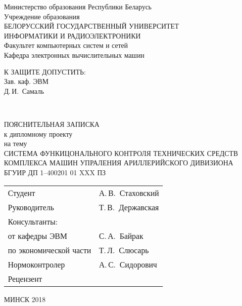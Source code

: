 \begin{titlepage}
  \begin{center}
    Министерство образования Республики Беларусь \\[1em]
    Учреждение образования \\
    БЕЛОРУССКИЙ ГОСУДАРСТВЕННЫЙ УНИВЕРСИТЕТ \\
    ИНФОРМАТИКИ И РАДИОЭЛЕКТРОНИКИ \\[1em]

    Факультет компьютерных систем и сетей \\ [1em]
    Кафедра электронных вычислительных машин \\[2em]

    \begin{flushright}
      \begin{minipage}{0.4\textwidth}
        К ЗАЩИТЕ ДОПУСТИТЬ: \\
        Зав. каф. ЭВМ \\
        \underline{\hspace*{2.8cm}} Д.\,И.~Самаль
      \end{minipage}\\[2.2em]
    \end{flushright}

    {ПОЯСНИТЕЛЬНАЯ ЗАПИСКА}\\
    {к дипломному проекту}\\
    {на тему}\\
    {СИСТЕМА ФУНКИЦОНАЛЬНОГО КОНТРОЛЯ ТЕХНИЧЕСКИХ СРЕДСТВ КОМПЛЕКСА МАШИН УПРАЛЕНИЯ АРИЛЛЕРИЙСКОГО ДИВИЗИОНА}\\[2em]


    {БГУИР ДП 1--400201 01 XXX ПЗ}\\[2em]

    \begin{tabular}{ p{}p{} }
      Студент & А.\,В.~Стаховский\\[1em]
      Руководитель & Т.\,В.~Державская \\[1em]
      Консультанты: &\\[1em]
      \hspace*{3ex}от кафедры ЭВМ & С.\,А.~Байрак \\[1em]
      \hspace*{3ex}по экономической части & Т.\,Л.~Слюсарь \\[1em]
      Нормоконтролер & А.\,С.~Сидорович\\[1em]
      Рецензент &
    \end{tabular}

    \vfill
    {\normalsize МИНСК 2018}
  \end{center}
\end{titlepage}

